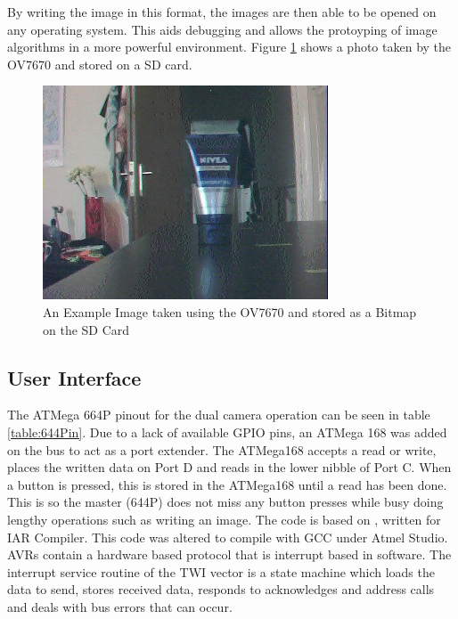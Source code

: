By writing the image in this format, the images are then able to be opened on any operating system. This aids debugging and allows the protoyping of image algorithms in a more powerful environment. Figure \ref{ExampleImage} shows a photo taken by the OV7670 and stored on a SD card.

\begin{figure}
\begin{center}
\includegraphics{Figures/ExampleImageFromCamera.jpg} 
\end{center}
\caption{An Example Image taken using the OV7670 and stored as a Bitmap on the SD Card}
\label{ExampleImage}
\end{figure}

\subsection{User Interface}
The ATMega 664P pinout for the dual camera operation can be seen in table \ref{table:644Pin}. Due to a lack of available GPIO pins, an ATMega 168 was added on the \itc bus to act as a port extender. The ATMega168 accepts a read or write, places the written data on Port D and reads in the lower nibble of Port C. When a button is pressed, this is stored in the ATMega168 until a read has been done. This is so the master (644P) does not miss any button presses while busy doing lengthy operations such as writing an image. The code is based on \cite{Atmel:I2CSlave}, written for IAR Compiler. This code was altered to compile with GCC under Atmel Studio. AVRs contain a hardware based \itc protocol that is interrupt based in software. The interrupt service routine of the TWI vector is a state machine which loads the data to send, stores received data, responds to acknowledges and address calls and deals with bus errors that can occur.

